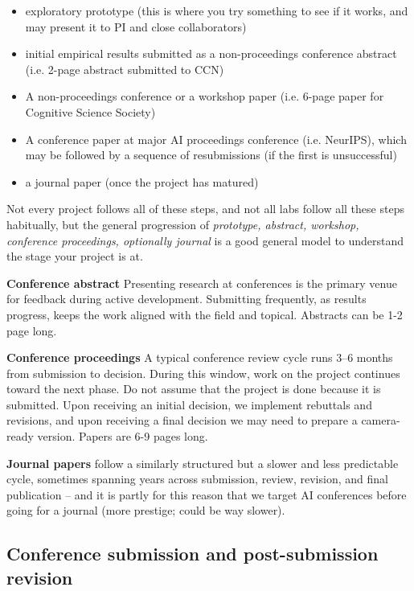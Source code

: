 \documentclass[11pt, letterpaper]{article}
\begin{document}
\begin{itemize}
    \item exploratory prototype (this is where you try something to see if it works, and may present it to PI and close collaborators)
    \item initial empirical results submitted as a non-proceedings conference abstract (i.e. 2-page abstract submitted to CCN)
    \item A non-proceedings conference or a workshop paper (i.e. 6-page paper for Cognitive Science Society)
    \item A conference paper at major AI proceedings conference (i.e. NeurIPS), which may be followed by a sequence of resubmissions (if the first is unsuccessful)
    \item a journal paper (once the project has matured)
\end{itemize}

Not every project follows all of these steps, and not all labs follow all these steps habitually, but the general progression of \emph{prototype, abstract, workshop, conference proceedings, optionally journal} is a good general model to understand the stage your project is at.


\textbf{Conference abstract} Presenting research at conferences is the primary venue for feedback during active development. Submitting frequently, as results progress, keeps the work aligned with the field and topical. Abstracts can be 1-2 page long.

\textbf{Conference proceedings} A typical conference review cycle runs 3--6 months from submission to decision. During this window, work on the project continues toward the next phase. Do not assume that the project is done because it is submitted. Upon receiving an initial decision, we implement rebuttals and revisions, and upon receiving a final decision we may need to prepare a camera-ready version. Papers are 6-9 pages long.

\textbf{Journal papers} follow a similarly structured but a slower and less predictable cycle, sometimes spanning years across submission, review, revision, and final publication -- and it is partly for this reason that we target AI conferences before going for a journal (more prestige; could be way slower). 

\subsection{Conference submission and post-submission revision}
 
\end{document}
